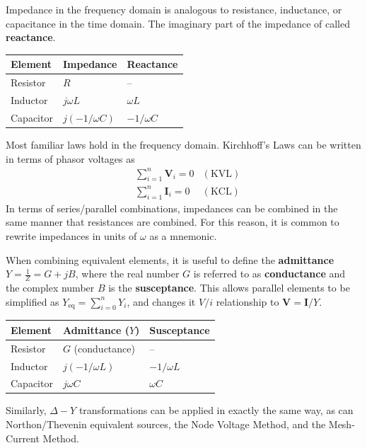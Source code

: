 \documentclass[a4paper,10pt]{report}
\newcommand{\vb}[1]{\mathbf{#1}}		%
\begin{document}
Impedance in the frequency domain is analogous to resistance, inductance, or capacitance in the time domain. The imaginary part of the impedance of called \textbf{reactance}.

\begin{table}[h]
\centering{}
\begin{tabular}{@{}lll@{}}
\toprule
\textbf{Element} 	&\textbf{Impedance} 		&\textbf{Reactance} \\ \midrule
Resistor			&$R$ 						&-- 				\\
Inductor			&$j\omega L$				&$\omega L$ 		\\
Capacitor			&$j(-1/\omega C)$  			&$-1/\omega C$ 		\\ \bottomrule
\end{tabular}
\end{table}


Most familiar laws hold in the frequency domain. Kirchhoff's Laws can be written in terms of phasor voltages as
\begin{align*}
	&\sum_{i=1}^n \vb{V}_i = 0 &(\text{KVL}) \\
	&\sum_{i=1}^n \vb{I}_i = 0 &(\text{KCL})
\end{align*}
In terms of series/parallel combinations, impedances can be combined in the same manner that resistances are combined. For this reason, it is common to rewrite impedances in units of $\omega$ as a mnemonic.

When combining equivalent elements, it is useful to define the \textbf{admittance} $Y = \frac{1}{Z} = G + jB$, where the real number $G$ is referred to as \textbf{conductance} and the complex number $B$ is the \textbf{susceptance}. This allows parallel elements to be simplified as $Y_{\text{eq}} = \sum_{i=0}^n Y_i$, and changes it $V/i$ relationship to $\vb{V} = \vb{I}/Y$.

\begin{table}[h]
\centering{}
\begin{tabular}{@{}lll@{}}
\toprule
\textbf{Element} 	&\textbf{Admittance ($Y$)} 	&\textbf{Susceptance} 	\\ \midrule
Resistor			&$G$ (conductance) 			&-- 					\\
Inductor			&$j(-1/\omega L)$			&$-1/\omega L$ 			\\
Capacitor			&$j\omega C$  				&$\omega C$ 			\\ \bottomrule
\end{tabular}
\end{table}

Similarly, $\Delta-Y$ transformations can be applied in exactly the same way, as can Northon/Thevenin equivalent sources, the Node Voltage Method, and the Mesh-Current Method.

\hrulefill
{}

\hrulefill
\end{document}
